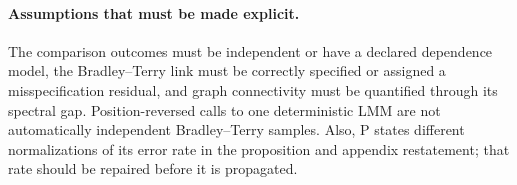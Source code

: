\paragraph{Assumptions that must be made explicit.}
The comparison outcomes must be independent or have a declared dependence
model, the Bradley--Terry link must be correctly specified or assigned a
misspecification residual, and graph connectivity must be quantified through
its spectral gap.  Position-reversed calls to one deterministic LMM are not
automatically independent Bradley--Terry samples.  Also, P states different
normalizations of its error rate in the proposition and appendix restatement;
that rate should be repaired before it is propagated.
